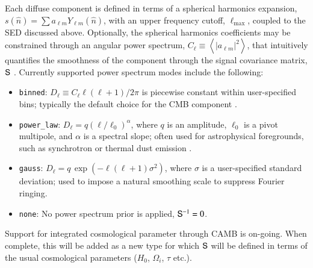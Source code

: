 \documentclass[twocolumn]{aa}
\renewcommand{\S}[0]{\tens{S}}
\begin{document}
Each diffuse component is defined in terms of a spherical harmonics
expansion, $s(\hat{n}) = \sum a_{\ell m} Y_{\ell m}(\hat{n})$, with an
upper frequency cutoff, $\ell_{\mathrm{max}}$, coupled to the SED discussed
above. Optionally, the spherical harmonics coefficients may be
constrained through an angular power spectrum,
$C_{\ell}\equiv\left<|a_{\ell m}|^2\right>$, that intuitively
quantifies the smoothness of the component through the signal
covariance matrix, $\S$ \citep{BP13}. Currently supported power
spectrum modes include the following:
\begin{itemize}
\item \texttt{binned}: $D_{\ell}\equiv C_{\ell}\ell(\ell+1)/2\pi$
is piecewise constant within user-specified bins; typically the
default choice for the CMB component \citep{BP11,BP12}. 
\item \texttt{power\_law}: $D_{\ell}=q(\ell/\ell_0)^{\alpha}$, where
  $q$ is an amplitude, $\ell_0$ is a pivot multipole, and $\alpha$ is
  a spectral slope; often used for astrophysical foregrounds, such as
  synchrotron or thermal dust emission \citep[e.g,][]{planck2014-a12}.
\item \texttt{gauss}: $D_{\ell} = q\,\exp(-\ell(\ell+1)\sigma^2)$,
  where $\sigma$ is a user-specified standard deviation; used to
  impose a natural smoothing scale to suppress Fourier ringing.
\item \texttt{none}: No power spectrum prior is applied, $\S^{-1}=0$.
\end{itemize}
Support for integrated cosmological parameter through CAMB
\citep{Lewis:1999bs} is on-going. When complete, this will be added as
a new type for which $\S$ will be defined in terms of the usual
cosmological parameters ($H_0$, $\Omega_i$, $\tau$ etc.).
\end{document}

